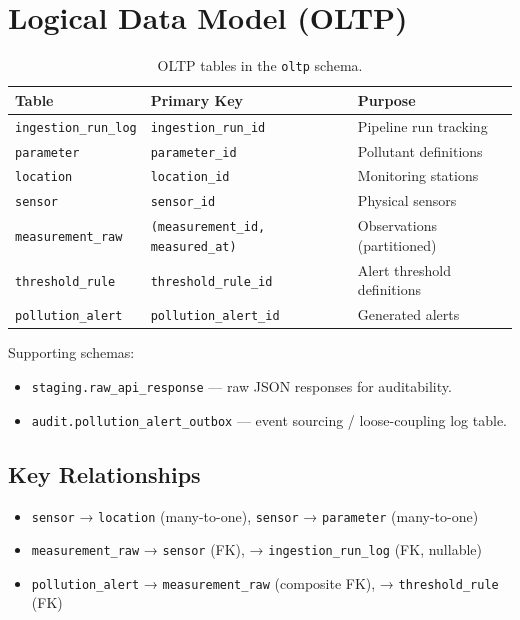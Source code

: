\documentclass[11pt,a4paper]{article}
\begin{document}
\section{Logical Data Model (OLTP)}

\begin{table}[H]
\centering
\small
\begin{tabular}{@{}lll@{}}
\toprule
\textbf{Table} & \textbf{Primary Key} & \textbf{Purpose} \\
\midrule
\texttt{ingestion\_run\_log} & \texttt{ingestion\_run\_id} & Pipeline run tracking \\
\texttt{parameter} & \texttt{parameter\_id} & Pollutant definitions \\
\texttt{location} & \texttt{location\_id} & Monitoring stations \\
\texttt{sensor} & \texttt{sensor\_id} & Physical sensors \\
\texttt{measurement\_raw} & \texttt{(measurement\_id, measured\_at)} & Observations (partitioned) \\
\texttt{threshold\_rule} & \texttt{threshold\_rule\_id} & Alert threshold definitions \\
\texttt{pollution\_alert} & \texttt{pollution\_alert\_id} & Generated alerts \\
\bottomrule
\end{tabular}
\caption{OLTP tables in the \texttt{oltp} schema.}
\end{table}

\noindent Supporting schemas:
\begin{itemize}[nosep]
  \item \texttt{staging.raw\_api\_response} --- raw JSON responses for auditability.
  \item \texttt{audit.pollution\_alert\_outbox} --- event sourcing / loose-coupling log table.
\end{itemize}

\subsection*{Key Relationships}
\begin{itemize}[nosep]
  \item \texttt{sensor} → \texttt{location} (many-to-one), \texttt{sensor} → \texttt{parameter} (many-to-one)
  \item \texttt{measurement\_raw} → \texttt{sensor} (FK), → \texttt{ingestion\_run\_log} (FK, nullable)
  \item \texttt{pollution\_alert} → \texttt{measurement\_raw} (composite FK), → \texttt{threshold\_rule} (FK)
\end{itemize}
\end{document}
